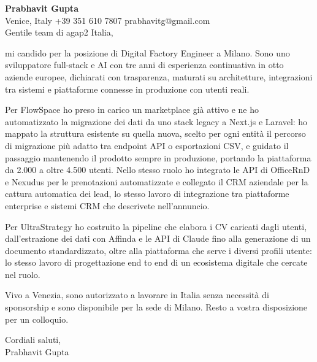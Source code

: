 \documentclass[a4paper,10.5pt]{article}
\begin{document}
\textbf{Prabhavit Gupta}\\
Venice, Italy \textbar{} +39 351 610 7807 \textbar{} prabhavitg@gmail.com\\[10pt]
Gentile team di agap2 Italia,

mi candido per la posizione di Digital Factory Engineer a Milano. Sono uno sviluppatore full-stack e AI con tre anni di esperienza continuativa in otto aziende europee, dichiarati con trasparenza, maturati su architetture, integrazioni tra sistemi e piattaforme connesse in produzione con utenti reali.

Per FlowSpace ho preso in carico un marketplace già attivo e ne ho automatizzato la migrazione dei dati da uno stack legacy a Next.js e Laravel: ho mappato la struttura esistente su quella nuova, scelto per ogni entità il percorso di migrazione più adatto tra endpoint API o esportazioni CSV, e guidato il passaggio mantenendo il prodotto sempre in produzione, portando la piattaforma da 2.000 a oltre 4.500 utenti. Nello stesso ruolo ho integrato le API di OfficeRnD e Nexudus per le prenotazioni automatizzate e collegato il CRM aziendale per la cattura automatica dei lead, lo stesso lavoro di integrazione tra piattaforme enterprise e sistemi CRM che descrivete nell'annuncio.

Per UltraStrategy ho costruito la pipeline che elabora i CV caricati dagli utenti, dall'estrazione dei dati con Affinda e le API di Claude fino alla generazione di un documento standardizzato, oltre alla piattaforma che serve i diversi profili utente: lo stesso lavoro di progettazione end to end di un ecosistema digitale che cercate nel ruolo.

Vivo a Venezia, sono autorizzato a lavorare in Italia senza necessità di sponsorship e sono disponibile per la sede di Milano. Resto a vostra disposizione per un colloquio.

Cordiali saluti,\\
Prabhavit Gupta
\end{document}
